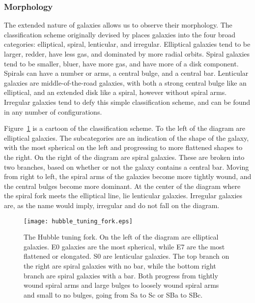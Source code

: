 \subsubsection{Morphology}

The extended nature of galaxies allows us to observe their morphology.  The classification scheme originally devised by \citet{hubble_1926} places galaxies into the four broad categories:  elliptical, spiral, lenticular, and irregular.  Elliptical galaxies tend to be larger, redder, have less gas, and dominated by more radial orbits.  Spiral galaxies tend to be smaller, bluer, have more gas, and have more of a disk component.  Spirals can have a number or arms, a central bulge, and a central bar.  Lenticular galaxies are middle-of-the-road galaxies, with both a strong central bulge like an elliptical, and an extended disk like a spiral, however without spiral arms.  Irregular galaxies tend to defy this simple classification scheme, and can be found in any number of configurations.

Figure~\ref{fig:tuning_fork} is a cartoon of the classification scheme.  To the left of the diagram are elliptical galaxies.  The subcategories are an indication of the shape of the galaxy, with the most spherical on the left and progressing to more flattened shapes to the right.  On the right of the diagram are spiral galaxies.  These are broken into two branches, based on whether or not the galaxy contains a central bar.  Moving from right to left, the spiral arms of the galaxies become more tightly wound, and the central bulges become more dominant.  At the center of the diagram where the spiral fork meets the elliptical line, lie lenticular galaxies.  Irregular galaxies are, as the name would imply, irregular and do not fall on the diagram.

\begin{figure}[t]
\centering
\texttt{[image: hubble\_tuning\_fork.eps]}
\caption[The Hubble tuning fork]{\footnotesize The Hubble tuning fork.  On the left of the diagram are elliptical galaxies.  E0 galaxies are the most spherical, while E7 are the most flattened or elongated.  S0 are lenticular galaxies.  The top branch on the right are spiral galaxies with no bar, while the bottom right branch are spiral galaxies with a bar.  Both progress from tightly wound spiral arms and large bulges to loosely wound spiral arms and small to no bulges, going from Sa to Sc or SBa to SBc.}
\label{fig:tuning_fork}
\end{figure}



